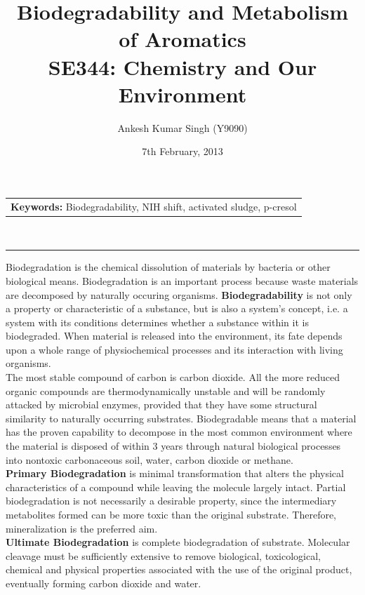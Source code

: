 \documentclass[pdftex,11pt,a4paper]{article}
\title{\vspace{-15pt}Biodegradability and Metabolism of Aromatics\\ SE344: Chemistry and Our Environment}
\author{Ankesh Kumar Singh (Y9090)}
\date{7th February, 2013}
\begin{document}
\maketitle
\begin{tabular}{p{370pt}}
\textbf{Keywords: }Biodegradability, NIH shift, activated sludge, p-cresol
\end{tabular}
\vspace{10pt}\\
\hrule
\vspace{10pt}
Biodegradation is the chemical dissolution of materials by bacteria or other biological means. Biodegradation is an important process because waste materials are decomposed by naturally occuring organisms. \textbf{Biodegradability} is not only a property or characteristic of a substance, but is also a system’s concept, i.e. a system with its conditions determines whether a substance within it is biodegraded. When material is released into the environment, its fate depends upon a whole range of physiochemical processes and its interaction with living organisms. \\

The most stable compound of carbon is carbon dioxide. All the more reduced organic compounds are thermodynamically unstable and will be randomly attacked by microbial enzymes, provided that they have some structural similarity to naturally occurring substrates. Biodegradable means that a material has the proven capability to decompose in the most common environment where the material is disposed of within 3 years through natural biological processes into nontoxic carbonaceous soil, water, carbon dioxide or methane.\\

\textbf{Primary Biodegradation} is minimal transformation that alters the physical characteristics of a compound while leaving the molecule largely intact. Partial biodegradation is not necessarily a desirable property, since the intermediary metabolites formed can be more toxic than the original substrate. Therefore, mineralization is the preferred aim.\\

\textbf{Ultimate Biodegradation} is complete biodegradation of substrate. Molecular cleavage must be sufficiently extensive to remove biological, toxicological, chemical and physical properties associated with the use of the original product, eventually forming carbon dioxide and water.
\end{document}
